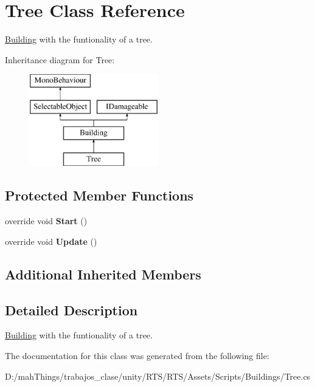 \hypertarget{class_tree}{}\section{Tree Class Reference}
\label{class_tree}


\mbox{\hyperlink{class_building}{Building}} with the funtionality of a tree.  


Inheritance diagram for Tree\+:\begin{figure}[H]
\begin{center}
\leavevmode
\includegraphics[height=4.000000cm]{class_tree}
\end{center}
\end{figure}
\subsection*{Protected Member Functions}
\begin{DoxyCompactItemize}
\item 
\mbox{\label{class_tree_aee92245d1ffa4ba0c62bf0ffee50361a}} 
override void {\bfseries Start} ()
\item 
\mbox{\label{class_tree_afd3992979703f19e6c676acd8bcf0022}} 
override void {\bfseries Update} ()
\end{DoxyCompactItemize}
\subsection*{Additional Inherited Members}


\subsection{Detailed Description}
\mbox{\hyperlink{class_building}{Building}} with the funtionality of a tree. 



The documentation for this class was generated from the following file\+:\begin{DoxyCompactItemize}
\item 
D\+:/mah\+Things/trabajos\+\_\+clase/unity/\+R\+T\+S/\+R\+T\+S/\+Assets/\+Scripts/\+Buildings/Tree.\+cs\end{DoxyCompactItemize}
